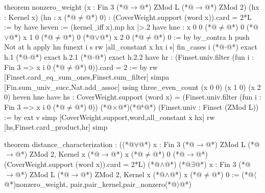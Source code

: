 theorem nonzero_weight (x : Fin 3 (*@$\to$@*) ZMod L (*@$\to$@*) ZMod 2) (hx : Kernel x) (hn : x (*@$\ne$@*) 0) :
    (CoverWeight.support (word x)).card = 2*L := by
  have heven := (kernel_iff x).mp hx |>.2
  have hne : x 0 0 (*@$\ne$@*) 0 (*@$\lor$@*) x 1 0 (*@$\ne$@*) 0 (*@$\lor$@*) x 2 0 (*@$\ne$@*) 0 := by
    by_contra h
    push Not at h
    apply hn
    funext i s
    rw [all_constant x hx i s]
    fin_cases i
    (*@$\cdot$@*) exact h.1
    (*@$\cdot$@*) exact h.2.1
    (*@$\cdot$@*) exact h.2.2
  have hr : (Finset.univ.filter (fun i : Fin 3 => x i 0 (*@$\ne$@*) 0)).card = 2 := by
    rw [Finset.card_eq_sum_ones,Finset.sum_filter]
    simpa [Fin.sum_univ_succ,Nat.add_assoc] using three_even_count (x 0 0) (x 1 0) (x 2 0) heven hne
  have hs : CoverWeight.support (word x) =
      (Finset.univ.filter (fun i : Fin 3 => x i 0 (*@$\ne$@*) 0)) (*@$\times$@*)(*@${}^{\mathsf s}$@*) (Finset.univ : Finset (ZMod L)) := by
    ext v
    simp [CoverWeight.support,word,all_constant x hx]
  rw [hs,Finset.card_product,hr]
  simp

theorem distance_characterization :
    ((*@$\forall$@*) x : Fin 3 (*@$\to$@*) ZMod L (*@$\to$@*) ZMod 2, Kernel x (*@$\to$@*) x (*@$\ne$@*) 0 (*@$\to$@*)
      (CoverWeight.support (word x)).card = 2*L) (*@$\land$@*)
    (*@$\exists$@*) x : Fin 3 (*@$\to$@*) ZMod L (*@$\to$@*) ZMod 2, Kernel x (*@$\land$@*) x (*@$\ne$@*) 0 :=
  (*@$\langle$@*)nonzero_weight, pair,pair_kernel,pair_nonzero(*@$\rangle$@*)
